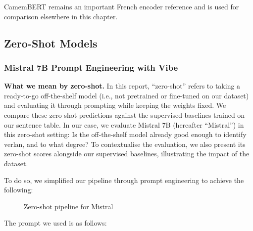 \documentclass[12pt]{article}
\begin{document}
CamemBERT \cite{martin2019camembert} remains an important French encoder reference and is used for comparison elsewhere in this chapter.


\subsection{Zero-Shot Models}
\subsubsection{Mistral 7B Prompt Engineering with Vibe}

\textbf{What we mean by zero-shot.} In this report, ``zero-shot'' refers to taking a ready-to-go off-the-shelf model (i.e., not pretrained or fine-tuned on our dataset) and evaluating it through prompting while keeping the weights fixed. We compare these zero-shot predictions against the supervised baselines trained on our sentence table. In our case, we evaluate Mistral 7B (hereafter ``Mistral'') in this zero-shot setting: Is the off-the-shelf model already good enough to identify verlan, and to what degree? To contextualise the evaluation, we also present its zero-shot scores alongside our supervised baselines, illustrating the impact of the dataset.

To do so, we simplified our pipeline through prompt engineering to achieve the following:

\begin{figure}[H]
    \centering
    \caption{Zero-shot pipeline for Mistral}
    \label{fig:mistral-zeroshot-pipeline}
\end{figure}

The prompt we used is as follows:
\end{document}
